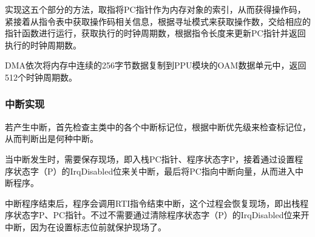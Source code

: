 \documentclass[a4paper]{ltxdoc}
\begin{document}
{实现这五个部分的方法，取指将PC指针作为内存对象的索引，从而获得操作码，紧接着从指令表中获取操作码相关信息，根据寻址模式来获取操作数，交给相应的指针函数进行运行，获取执行的时钟周期数，根据指令长度来更新PC指针并返回执行的时钟周期数。

DMA依次将内存中连续的256字节数据复制到PPU模块的OAM数据单元中，返回512个时钟周期数。


\subsubsection{中断实现}
若产生中断，首先检查主类中的各个中断标记位，根据中断优先级来检查标记位，从而判断出是何种中断。

当中断发生时，需要保存现场，即入栈PC指针、程序状态字P，接着通过设置程序状态字（P）的IrqDisabled位来关中断，最后将PC指向中断向量，从而进入中断程序。


中断程序结束后，程序会调用RTI指令结束中断，这个过程会恢复现场，即出栈程序状态字P、PC指针。不过不需要通过清除程序状态字（P）的IrqDisabled位来开中断，因为在设置标志位前就保护现场了。

}
\end{document}

